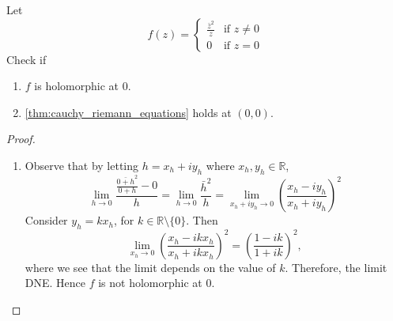 \documentclass[11pt, oneside]{book}
\begin{document}
\begin{eg}\label{eg:counterexample_for_converse_of_cre}
	Let
	\begin{equation*}
		f(z) = \begin{cases}
			\frac{\bar{z}^2}{z} & \text{if } z \neq 0 \\
			0		& \text{if } z = 0
		\end{cases}
	\end{equation*}
	Check if
	\begin{enumerate}
		\item $f$ is holomorphic at $0$.
		\item \cref{thm:cauchy_riemann_equations} holds at $(0, 0)$.
	\end{enumerate}

	\begin{proof}
		\begin{enumerate}
			\item Observe that by letting $h = x_h + iy_h$ where $x_h, y_h \in \mathbb{R}$,
			\begin{equation*}
				\lim_{h \to 0} \frac{\frac{\bar{0 + h}^2}{0 + h} - 0}{h} = \lim_{h \to 0} \frac{\bar{h}^2}{h} = \lim_{x_h + iy_h \to 0} \left(\frac{x_h - iy_h}{x_h + iy_h} \right)^2
			\end{equation*}
			Consider $y_h = kx_h$, for $k \in \mathbb{R} \setminus \{0\}$. Then
			\begin{equation*}
				\lim_{x_h \to 0} \left( \frac{x_h - ikx_h}{x_h + ikx_h} \right)^2 = \left( \frac{1 - ik}{1 + ik} \right)^2,
			\end{equation*}
			where we see that the limit depends on the value of $k$. Therefore, the limit DNE. Hence $f$ is not holomorphic at $0$.


\end{enumerate}
\end{proof}
\end{eg}
\end{document}
